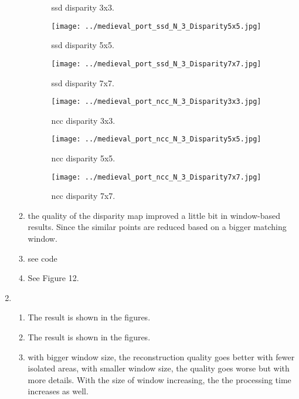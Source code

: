 \documentclass[a4paper, twoside, english]{article}
\begin{document}
\begin{enumerate}
\begin{enumerate}
\begin{figure}[h!]
\begin{minipage}[b]{0.3\textwidth}
				\caption{ssd disparity 3x3.}
			\end{minipage}
			\hfill
			\begin{minipage}[b]{0.3\textwidth}
				\texttt{[image: ../medieval\_port\_ssd\_N\_3\_Disparity5x5.jpg]}
				\caption{ssd disparity 5x5.}
			\end{minipage}
			\hfill
			\begin{minipage}[b]{0.3\textwidth}
				\texttt{[image: ../medieval\_port\_ssd\_N\_3\_Disparity7x7.jpg]}
				\caption{ssd disparity 7x7.}
			\end{minipage}
			\hfill
			\begin{minipage}[b]{0.3\textwidth}
				\texttt{[image: ../medieval\_port\_ncc\_N\_3\_Disparity3x3.jpg]}
				\caption{ncc disparity 3x3.}
			\end{minipage}
			\hfill
			\begin{minipage}[b]{0.3\textwidth}
				\texttt{[image: ../medieval\_port\_ncc\_N\_3\_Disparity5x5.jpg]}
				\caption{ncc disparity 5x5.}
			\end{minipage}
			\hfill
			\begin{minipage}[b]{0.3\textwidth}
				\texttt{[image: ../medieval\_port\_ncc\_N\_3\_Disparity7x7.jpg]}
				\caption{ncc disparity 7x7.}
			\end{minipage}
			\hfill
		\end{figure} 
		\item the quality of the disparity map improved a little bit in window-based results. Since the similar points are reduced based on a bigger matching window.
		\item see code
		\item See Figure 12.
	\end{enumerate}
	
	\item 
	\begin{enumerate}
		\item The result is shown in the figures.
		\item The result is shown in the figures.
		\item with bigger window size, the reconstruction quality goes better with fewer isolated areas, with smaller window size, the quality goes worse but with more details. With the size of window increasing, the the processing time increases as well.
	\end{enumerate} 
\end{enumerate}



\newpage
\end{document}

